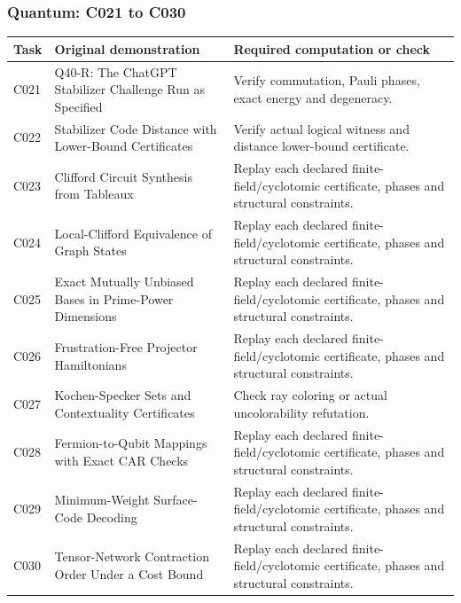 \documentclass[
  11pt,
]{article}
\begin{document}
\subsubsection{Quantum: C021 to C030}\label{quantum-c021-to-c030}

\begin{longtable}[]{@{}
  >{\raggedright\arraybackslash}p{}
  >{\raggedright\arraybackslash}p{}
  >{\raggedright\arraybackslash}p{}@{}}
\toprule\noalign{}
\begin{minipage}[b]{\linewidth}\raggedright
Task
\end{minipage} & \begin{minipage}[b]{\linewidth}\raggedright
Original demonstration
\end{minipage} & \begin{minipage}[b]{\linewidth}\raggedright
Required computation or check
\end{minipage} \\
\midrule\noalign{}
\endhead
\bottomrule\noalign{}
\endlastfoot
C021 & Q40-R: The ChatGPT Stabilizer Challenge Run as Specified & Verify
commutation, Pauli phases, exact energy and degeneracy. \\
C022 & Stabilizer Code Distance with Lower-Bound Certificates & Verify
actual logical witness and distance lower-bound certificate. \\
C023 & Clifford Circuit Synthesis from Tableaux & Replay each declared
finite-field/cyclotomic certificate, phases and structural
constraints. \\
C024 & Local-Clifford Equivalence of Graph States & Replay each declared
finite-field/cyclotomic certificate, phases and structural
constraints. \\
C025 & Exact Mutually Unbiased Bases in Prime-Power Dimensions & Replay
each declared finite-field/cyclotomic certificate, phases and structural
constraints. \\
C026 & Frustration-Free Projector Hamiltonians & Replay each declared
finite-field/cyclotomic certificate, phases and structural
constraints. \\
C027 & Kochen-Specker Sets and Contextuality Certificates & Check ray
coloring or actual uncolorability refutation. \\
C028 & Fermion-to-Qubit Mappings with Exact CAR Checks & Replay each
declared finite-field/cyclotomic certificate, phases and structural
constraints. \\
C029 & Minimum-Weight Surface-Code Decoding & Replay each declared
finite-field/cyclotomic certificate, phases and structural
constraints. \\
C030 & Tensor-Network Contraction Order Under a Cost Bound & Replay each
declared finite-field/cyclotomic certificate, phases and structural
constraints. \\
\end{longtable}
\end{document}
